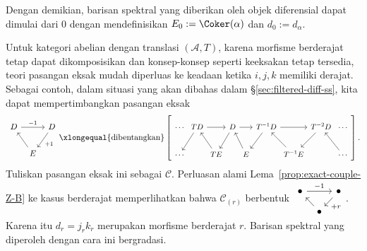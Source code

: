 Dengan demikian, barisan spektral yang diberikan oleh objek diferensial dapat
dimulai dari $0$ dengan mendefinisikan $E_0:=\Coker(\alpha)$ dan
$d_0:=d_\alpha$.

Untuk kategori abelian dengan translasi $(\mathcal{A},T)$, karena morfisme
berderajat tetap dapat dikomposisikan dan konsep-konsep seperti keeksakan tetap
tersedia, teori pasangan eksak mudah diperluas ke keadaan ketika $i,j,k$
memiliki derajat. Sebagai contoh, dalam situasi yang akan dibahas dalam
\S\ref{sec:filtered-diff-ss}, kita dapat mempertimbangkan pasangan eksak
\[\begin{tikzcd}[column sep=tiny]
	D \arrow[rr, "{-1}"] & & D \arrow[ld, "{+1}"] \\
	& E \arrow[lu] &
\end{tikzcd} \xlongequal{\text{dibentangkan}} \left[
	\begin{tikzcd}[column sep=0ex, every cell/.append style={font=\small}]
		\cdots & TD \arrow[rr] \arrow[ld] & & D \arrow[rr] \arrow[ld] & &
		T^{-1}D \arrow[rr] \arrow[ld] & & T^{-2}D \arrow[ld] & \cdots \\
		\cdots & & TE \arrow[lu] & & E \arrow[lu] & &
		T^{-1}E \arrow[lu] & & \cdots \arrow[lu]
	\end{tikzcd}
\right]. \]
Tuliskan pasangan eksak ini sebagai $\mathscr{C}$. Perluasan alami
Lema~\ref{prop:exact-couple-Z-B} ke kasus berderajat memperlihatkan bahwa
$\mathscr{C}_{(r)}$ berbentuk
$\begin{tikzcd}[column sep=tiny, row sep=small]
	\bullet \arrow[rr, "{-1}"] & & \bullet \arrow[ld, "{+r}"] \\
	& \bullet \arrow[lu] &
\end{tikzcd}$.
Karena itu $d_r=j_rk_r$ merupakan morfisme berderajat $r$. Barisan spektral
yang diperoleh dengan cara ini bergradasi.
